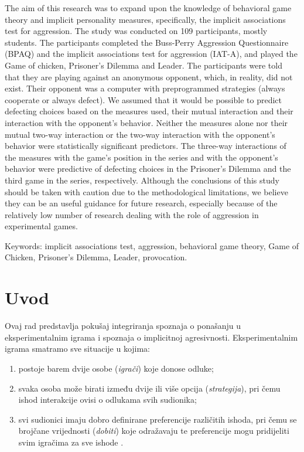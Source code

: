 \documentclass[a4paper, 12pt]{report}
\begin{document}
\begin{singlespace}
\noindent The aim of this research was to expand upon the knowledge of behavioral game theory
and implicit personality measures, specifically, the implicit associations test
for aggression. The study was conducted on 109 participants, mostly students.
The participants completed the Buss-Perry Aggression Questionnaire (BPAQ) and
the implicit associations test for aggression (IAT-A), and played the Game of
chicken, Prisoner's Dilemma and Leader. The participants were told that they are
playing against an anonymous opponent, which, in reality, did not exist. Their
opponent was a computer with preprogrammed strategies (always cooperate or
always defect). We assumed that it would be possible to predict defecting
choices based on the measures used, their mutual interaction and their
interaction with the opponent's behavior. Neither the measures alone nor their
mutual two-way interaction or the two-way interaction with the opponent's
behavior were statistically significant predictors. The three-way interactions
of the measures with the game's position in the series and with the opponent's
behavior were predictive of defecting choices in the Prisoner's Dilemma and the
third game in the series, respectively. Although the conclusions of this study
should be taken with caution due to the methodological limitations, we believe
they can be an useful guidance for future research, especially because of the
relatively low number of research dealing with the role of aggression in
experimental games.
\bigskip

\noindent Keywords: implicit associations test, aggression, behavioral game
theory, Game of Chicken, Prisoner's Dilemma, Leader, provocation.
\end{singlespace}

\thispagestyle{empty}
\clearpage

\setcounter{page}{1}
\section{Uvod}

Ovaj rad predstavlja pokušaj integriranja spoznaja o ponašanju u
eksperimentalnim igrama i spoznaja o implicitnoj agresivnosti.
Eksperimentalnim igrama smatramo sve situacije u kojima: 
\begin{enumerate}[label = (\alph*)]
    \item postoje barem dvije osobe (\emph{igrači}) koje donose odluke;
    \item svaka osoba može birati između dvije ili više opcija
        (\emph{strategija}), pri čemu ishod
        interakcije ovisi o odlukama svih sudionika;
    \item svi sudionici imaju dobro definirane preferencije  različitih
        ishoda, pri čemu se brojčane vrijednosti (\emph{dobiti}) koje odražavaju te
        preferencije mogu pridijeliti svim igračima za sve ishode \citep{colgt}.
\end{enumerate}
\end{document}
